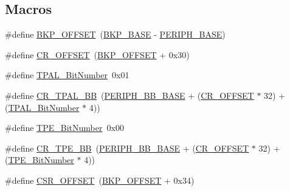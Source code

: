 \subsection*{Macros}
\begin{DoxyCompactItemize}
\item 
\#define \hyperlink{group___b_k_p___private___defines_gaaaf71f474657e7c0c5b0d6ba9697cf5d}{B\+K\+P\+\_\+\+O\+F\+F\+S\+ET}~(\hyperlink{group___peripheral__memory__map_gaa15d5a9f40794105397ba5ea567c4ae1}{B\+K\+P\+\_\+\+B\+A\+SE} -\/ \hyperlink{group___peripheral__memory__map_ga9171f49478fa86d932f89e78e73b88b0}{P\+E\+R\+I\+P\+H\+\_\+\+B\+A\+SE})
\item 
\#define \hyperlink{group___b_k_p___private___defines_gafa1d3d0ea72132df651c76fc1bdffffc}{C\+R\+\_\+\+O\+F\+F\+S\+ET}~(\hyperlink{group___b_k_p___private___defines_gaaaf71f474657e7c0c5b0d6ba9697cf5d}{B\+K\+P\+\_\+\+O\+F\+F\+S\+ET} + 0x30)
\item 
\#define \hyperlink{group___b_k_p___private___defines_ga4af1869d665b8804104b6754c787820a}{T\+P\+A\+L\+\_\+\+Bit\+Number}~0x01
\item 
\#define \hyperlink{group___b_k_p___private___defines_gaa36e52f37b9fa6982bd224a6dcb86f78}{C\+R\+\_\+\+T\+P\+A\+L\+\_\+\+BB}~(\hyperlink{group___peripheral__memory__map_gaed7efc100877000845c236ccdc9e144a}{P\+E\+R\+I\+P\+H\+\_\+\+B\+B\+\_\+\+B\+A\+SE} + (\hyperlink{group___r_c_c___private___defines_gafa1d3d0ea72132df651c76fc1bdffffc}{C\+R\+\_\+\+O\+F\+F\+S\+ET} $\ast$ 32) + (\hyperlink{group___b_k_p___private___defines_ga4af1869d665b8804104b6754c787820a}{T\+P\+A\+L\+\_\+\+Bit\+Number} $\ast$ 4))
\item 
\#define \hyperlink{group___b_k_p___private___defines_ga8c68be900246b028ff4af93ad119eb98}{T\+P\+E\+\_\+\+Bit\+Number}~0x00
\item 
\#define \hyperlink{group___b_k_p___private___defines_ga6c11e801c2c1aa87ec2feaefe12bbb96}{C\+R\+\_\+\+T\+P\+E\+\_\+\+BB}~(\hyperlink{group___peripheral__memory__map_gaed7efc100877000845c236ccdc9e144a}{P\+E\+R\+I\+P\+H\+\_\+\+B\+B\+\_\+\+B\+A\+SE} + (\hyperlink{group___r_c_c___private___defines_gafa1d3d0ea72132df651c76fc1bdffffc}{C\+R\+\_\+\+O\+F\+F\+S\+ET} $\ast$ 32) + (\hyperlink{group___b_k_p___private___defines_ga8c68be900246b028ff4af93ad119eb98}{T\+P\+E\+\_\+\+Bit\+Number} $\ast$ 4))
\item 
\#define \hyperlink{group___b_k_p___private___defines_ga984cbe73312b6d3d355c5053763d499a}{C\+S\+R\+\_\+\+O\+F\+F\+S\+ET}~(\hyperlink{group___b_k_p___private___defines_gaaaf71f474657e7c0c5b0d6ba9697cf5d}{B\+K\+P\+\_\+\+O\+F\+F\+S\+ET} + 0x34)

\end{DoxyCompactItemize}
